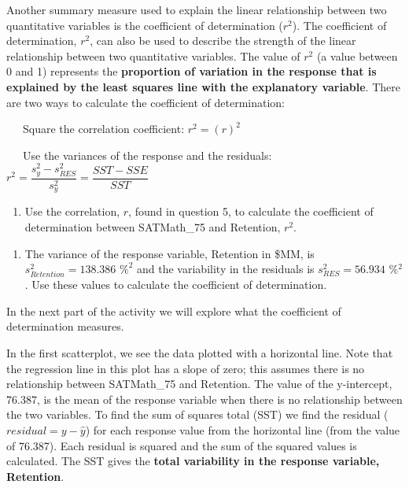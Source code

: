 \documentclass[
]{report}
\providecommand{\tightlist}{%
  \setlength{\itemsep}{0pt}\setlength{\parskip}{0pt}}
\begin{document}
Another summary measure used to explain the linear relationship between two quantitative variables is the coefficient of determination (\(r^2\)). The coefficient of determination, \(r^2\), can also be used to describe the strength of the linear relationship between two quantitative variables. The value of \(r^2\) (a value between 0 and 1) represents the \textbf{proportion of variation in the response that is explained by the least squares line with the explanatory variable}. There are two ways to calculate the coefficient of determination:

~~~Square the correlation coefficient: \(r^2 = (r)^2\)

~~~Use the variances of the response and the residuals: \(r^2 = \dfrac{s_y^2 - s_{RES}^2}{s_y^2} = \dfrac{SST - SSE}{SST}\)

\begin{enumerate}
\def\labelenumi{\arabic{enumi}.}
\setcounter{enumi}{5}
\tightlist
\item
  Use the correlation, \(r\), found in question 5, to calculate the coefficient of determination between SATMath\_75 and Retention, \(r^2\).
\end{enumerate}

\vspace{.4in}

\begin{enumerate}
\def\labelenumi{\arabic{enumi}.}
\setcounter{enumi}{6}
\tightlist
\item
  The variance of the response variable, Retention in \$MM, is \(s_{Retention}^2 = 138.386\) \(\%^2\) and the variability in the residuals is \(s_{RES}^2 = 56.934\) \%\(^2\). Use these values to calculate the coefficient of determination.
\end{enumerate}

\vspace{1in}

In the next part of the activity we will explore what the coefficient of determination measures.

In the first scatterplot, we see the data plotted with a horizontal line. Note that the regression line in this plot has a slope of zero; this assumes there is no relationship between SATMath\_75 and Retention. The value of the y-intercept, 76.387, is the mean of the response variable when there is no relationship between the two variables. To find the sum of squares total (SST) we find the residual (\(residual = y - \hat{y}\)) for each response value from the horizontal line (from the value of 76.387). Each residual is squared and the sum of the squared values is calculated. The SST gives the \textbf{total variability in the response variable, Retention}.
\end{document}
